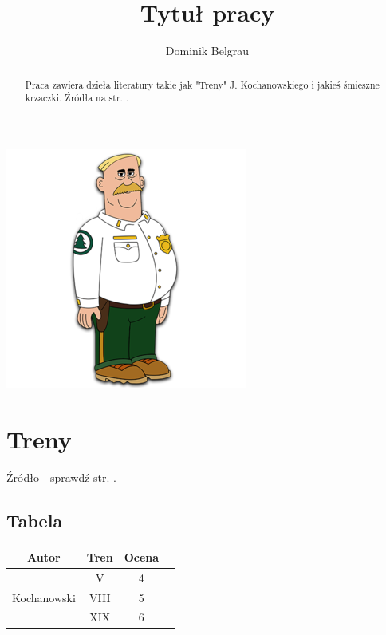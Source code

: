 \documentclass{article}
\title{Tytuł pracy}
\author{Dominik Belgrau}
\begin{document}
\maketitle

\begin{abstract}
    Praca zawiera dzieła literatury takie jak "Treny" J. Kochanowskiego i jakieś śmieszne krzaczki. Źródła na str. \pageref{bb}.
\end{abstract}

\begin{center}
\includegraphics{woody.png} \label{o0}
\end{center}

\newpage

\tableofcontents

\newpage

\section{Treny}

Źródło - sprawdź str. \pageref{bb}.

\subsection{Tabela} \label{tab}
\begin{center}
\begin{tabular}{ |c|c|c|c| } 
\hline
Autor & Tren & Ocena \\
\hline
\multirow{3}{8em}{Kochanowski}  & V & 4 \\ 
& VIII & 5 \\ 
& XIX & 6 \\ 
\hline
\end{tabular}
\end{center}
\end{document}

